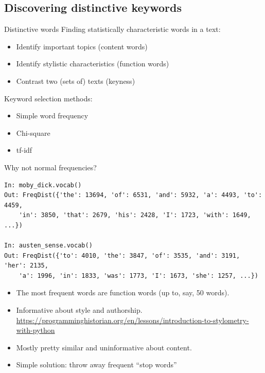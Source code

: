 \documentclass[aspectratio=169,usenames,dvipsnames]{beamer}
\begin{document}
\subsection{Discovering distinctive keywords}
\begin{frame}{Distinctive words}
    Finding statistically characteristic words in a text:
	\begin{itemize}
        \item Identify important topics (content words)
        \item Identify stylistic characteristics (function words)
        \item Contrast two (sets of) texts (keyness)
	\end{itemize}

    Keyword selection methods:
    \begin{itemize}
        \item Simple word frequency
        \item Chi-square
        \item tf-idf
    \end{itemize}

\end{frame}

\begin{frame}[fragile]{Why not normal frequencies?}
\begin{lstlisting}
In: moby_dick.vocab()
Out: FreqDist({'the': 13694, 'of': 6531, 'and': 5932, 'a': 4493, 'to': 4459,
    'in': 3850, 'that': 2679, 'his': 2428, 'I': 1723, 'with': 1649, ...})

In: austen_sense.vocab()
Out: FreqDist({'to': 4010, 'the': 3847, 'of': 3535, 'and': 3191, 'her': 2135,
    'a': 1996, 'in': 1833, 'was': 1773, 'I': 1673, 'she': 1257, ...})
\end{lstlisting}

\begin{itemize}
    \item The most frequent words are function words (up to, say, 50 words).
    \item Informative about style and authorship.
        \url{https://programminghistorian.org/en/lessons/introduction-to-stylometry-with-python}
    \item Mostly pretty similar and uninformative about content.
    \item Simple solution: throw away frequent ``stop words''
\end{itemize}
\end{frame}
\end{document}
